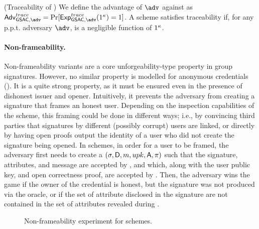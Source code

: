 \begin{definition}{(Traceability of \GSAC)}
  \label{def:trace-gsac}
  We define the advantage \AdvGSACTrace of $\adv$ against \ExpGSACTrace as
  $\AdvGSACTrace=\Pr\lbrack\ExpGSACTrace(1^\secpar)=1\rbrack$.
  A \GSAC scheme satisfies traceability if, for any p.p.t. adversary $\adv$,
  \AdvGSACTrace is a negligible function of $1^\kappa$.
\end{definition}

\paragraph{Non-frameability.} %
Non-frameability variants are a core unforgeability-type property in group
signatures. However, no
similar property is modelled for anonymous credentials (). It is a quite strong
property, as it must be ensured even in the presence of dishonest issuer and
opener. Intuitively, it prevents the adversary from creating a signature that
frames an honest user. Depending on the inspection capabilities of the scheme,
this framing could be done in different ways; i.e., by convincing third parties
that signatures by different (possibly corrupt) users are linked, or directly
by having open proofs output the identity of a user who did not create the
signature being opened.
%
In \GSAC schemes, in order for a user to be framed, the adversary first needs to
create a $(\sigma,\mathsf{D},m,upk,\mathsf{A},\pi)$ such that the signature,
attributes, and message are accepted by \Verify, and which, along with the user
public key, and open correctness proof, are accepted by \Judge.
Then, the adversary wins the game if the owner of the credential is honest, but
the signature was not produced via the \SIGN oracle, or if the set of attribute
disclosed in the signature are not contained in the set of attributes revealed
during \Open.

\begin{figure}[htp!]
  \caption{Non-frameability experiment for \GSAC schemes.}
  \label{fig:exp-gsac-frame}
\end{figure}


